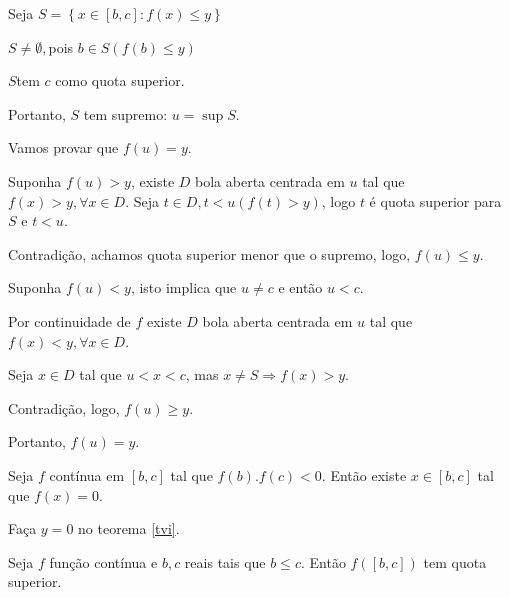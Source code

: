 \documentclass[11pt, oneside, a4paper]{gsm-l}
\begin{document}
\begin{dem}


Seja $S = \left\{ {x \in \left[ {b,c} \right]:f\left( x \right) \leqslant y}
\right\}$

$S \ne \emptyset ,$pois $b \in S\left( {f\left( b \right) \leqslant y}
\right)$

$S$tem $c$ como quota superior.

Portanto, $S$ tem supremo: $u = \sup S$.

Vamos provar que $f\left( u \right) = y$.

Suponha $f\left( u \right) > y$, existe $D$ bola aberta centrada em $u$ tal
que $f\left( x \right) > y,\forall x \in D$. Seja $t \in D,t < u\left(
{f\left( t \right) > y} \right)$, logo $t$ é quota superior para $S$ e
$t < u$.

Contradição, achamos quota superior menor que o supremo, logo,
$f\left( u \right) \leqslant y$.

Suponha $f\left( u \right) < y$, isto implica que $u \ne c$ e então $u <
c$.

Por continuidade de $f$ existe $D$ bola aberta centrada em $u$ tal que \\
$f\left( x \right) < y,\forall x \in D$.

Seja $x \in D$ tal que $u < x < c$, mas $x \ne S \Rightarrow f\left( x
\right) > y$.

Contradição, logo, $f\left( u \right) \geqslant y$.

Portanto, $f\left( u \right) = y$.

\end{dem}

\begin{teo}

Seja $f$ contínua em $\left[ {b,c} \right]$ tal que $f\left( b
\right).f\left( c \right) < 0$. Então existe $x \in \left[ {b,c}
\right]$ tal que $f\left( x \right) = 0$.

\end{teo}

\begin{dem}

Faça $y=0$ no teorema \ref{tvi}.

\end{dem}

\begin{teo} \label{t1}

Seja $f$ função contínua e $b,c$ reais tais que $b \leqslant
c$. Então $f\left( {\left[ {b,c} \right]} \right)$ tem quota superior.

\end{teo}
\end{document}
